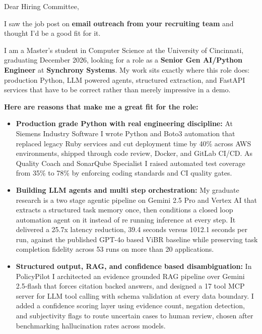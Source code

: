 \documentclass[11pt]{letter}
\date{}
\begin{document}
\begin{letter}{}

\opening{Dear Hiring Committee,}

I saw the job post on \textbf{email outreach from your recruiting team} and thought I'd be a good fit for it.

I am a Master's student in Computer Science at the University of Cincinnati, graduating December 2026, looking for a role as a \textbf{Senior Gen AI/Python Engineer} at \textbf{Synchrony Systems}. My work sits exactly where this role does: production Python, LLM powered agents, structured extraction, and FastAPI services that have to be correct rather than merely impressive in a demo.

\textbf{Here are reasons that make me a great fit for the role:}

\begin{itemize}[leftmargin=*, itemsep=0.45em]
    \item \textbf{Production grade Python with real engineering discipline:} At Siemens Industry Software I wrote Python and Boto3 automation that replaced legacy Ruby services and cut deployment time by 40\% across AWS environments, shipped through code review, Docker, and GitLab CI/CD. As Quality Coach and SonarQube Specialist I raised automated test coverage from 35\% to 78\% by enforcing coding standards and CI quality gates.

    \item \textbf{Building LLM agents and multi step orchestration:} My graduate research is a two stage agentic pipeline on Gemini 2.5 Pro and Vertex AI that extracts a structured task memory once, then conditions a closed loop automation agent on it instead of re running inference at every step. It delivered a 25.7x latency reduction, 39.4 seconds versus 1012.1 seconds per run, against the published GPT-4o based ViBR baseline while preserving task completion fidelity across 53 runs on more than 20 applications.

    \item \textbf{Structured output, RAG, and confidence based disambiguation:} In PolicyPilot I architected an evidence grounded RAG pipeline over Gemini 2.5-flash that forces citation backed answers, and designed a 17 tool MCP server for LLM tool calling with schema validation at every data boundary. I added a confidence scoring layer using evidence count, negation detection, and subjectivity flags to route uncertain cases to human review, chosen after benchmarking hallucination rates across models.


\end{itemize}
\end{letter}
\end{document}
